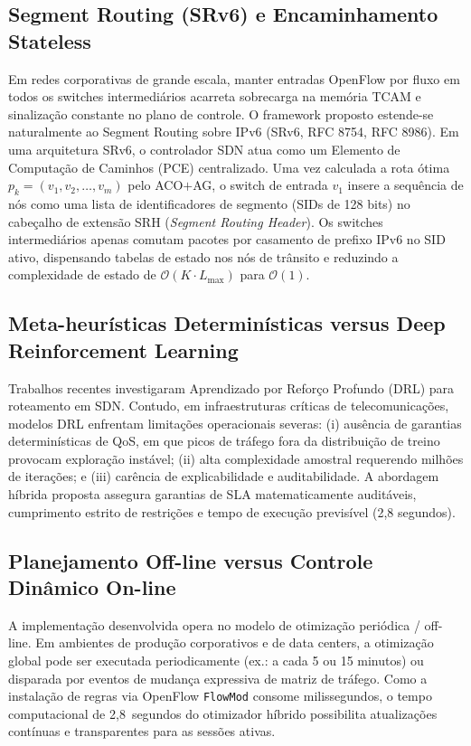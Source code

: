 \documentclass[journal]{IEEEtran}
\begin{document}
\subsection{Segment Routing (SRv6) e Encaminhamento Stateless}
Em redes corporativas de grande escala, manter entradas OpenFlow por fluxo em todos os switches intermedi\'{a}rios acarreta sobrecarga na mem\'{o}ria TCAM e sinaliza\c{c}\~{a}o constante no plano de controle. O framework proposto estende-se naturalmente ao Segment Routing sobre IPv6 (SRv6, RFC 8754, RFC 8986). Em uma arquitetura SRv6, o controlador SDN atua como um Elemento de Computa\c{c}\~{a}o de Caminhos (PCE) centralizado. Uma vez calculada a rota \'{o}tima $p_k = (v_1, v_2, \dots, v_m)$ pelo ACO$+$AG, o switch de entrada $v_1$ insere a sequ\^{e}ncia de n\'{o}s como uma lista de identificadores de segmento (SIDs de 128 bits) no cabe\c{c}alho de extens\~{a}o SRH (\emph{Segment Routing Header}). Os switches intermedi\'{a}rios apenas comutam pacotes por casamento de prefixo IPv6 no SID ativo, dispensando tabelas de estado nos n\'{o}s de tr\^{a}nsito e reduzindo a complexidade de estado de $\mathcal{O}(K \cdot L_{\max})$ para $\mathcal{O}(1)$.

\subsection{Meta-heur\'{i}sticas Determin\'{i}sticas versus Deep Reinforcement Learning}
Trabalhos recentes investigaram Aprendizado por Refor\c{c}o Profundo (DRL) para roteamento em SDN. Contudo, em infraestruturas cr\'{i}ticas de telecomunica\c{c}\~{o}es, modelos DRL enfrentam limita\c{c}\~{o}es operacionais severas: (i) aus\^{e}ncia de garantias determin\'{i}sticas de QoS, em que picos de tr\'{a}fego fora da distribui\c{c}\~{a}o de treino provocam explora\c{c}\~{a}o inst\'{a}vel; (ii) alta complexidade amostral requerendo milh\~{o}es de itera\c{c}\~{o}es; e (iii) car\^{e}ncia de explicabilidade e auditabilidade. A abordagem h\'{i}brida proposta assegura garantias de SLA matematicamente audit\'{a}veis, cumprimento estrito de restri\c{c}\~{o}es e tempo de execu\c{c}\~{a}o previs\'{i}vel (2,8 segundos).

\subsection{Planejamento Off-line versus Controle Din\^{a}mico On-line}
A implementa\c{c}\~{a}o desenvolvida opera no modelo de otimiza\c{c}\~{a}o peri\'{o}dica / off-line. Em ambientes de produ\c{c}\~{a}o corporativos e de data centers, a otimiza\c{c}\~{a}o global pode ser executada periodicamente (ex.: a cada 5 ou 15 minutos) ou disparada por eventos de mudan\c{c}a expressiva de matriz de tr\'{a}fego. Como a instala\c{c}\~{a}o de regras via OpenFlow \texttt{FlowMod} consome milissegundos, o tempo computacional de 2,8~segundos do otimizador h\'{i}brido possibilita atualiza\c{c}\~{o}es cont\'{i}nuas e transparentes para as sess\~{o}es ativas.
\end{document}
